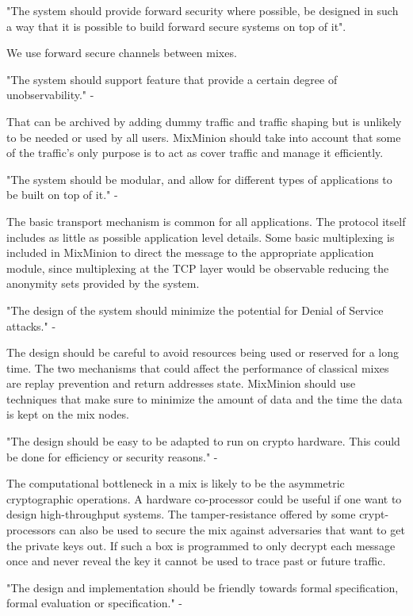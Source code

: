      "The system should provide forward security where possible, be
     designed in such a way that it is possible to build forward
     secure systems on top of it".

We use forward secure channels between mixes. 

     "The system should support feature that provide a certain degree
      of unobservability." -

That can be archived by adding dummy traffic and traffic shaping but
is unlikely to be needed or used by all users. MixMinion should take
into account that some of the traffic's only purpose is to act as
cover traffic and manage it efficiently.

     "The system should be modular, and allow for different types of
     applications to be built on top of it." -

The basic transport mechanism is common for all applications. The
protocol itself includes as little as possible application level
details. Some basic multiplexing is included in MixMinion to direct
the message to the appropriate application module, since multiplexing
at the TCP layer would be observable reducing the anonymity sets
provided by the system.

     "The design of the system should minimize the potential for
     Denial of Service attacks." -

The design should be careful to avoid resources being used or reserved
for a long time. The two mechanisms that could affect the performance
of classical mixes are replay prevention and return addresses
state. MixMinion should use techniques that make sure to minimize the
amount of data and the time the data is kept on the mix nodes. 

     "The design should be easy to be adapted to run on crypto
     hardware. This could be done for efficiency or security reasons."
     -

The computational bottleneck in a mix is likely to be the asymmetric
cryptographic operations. A hardware co-processor could be useful if
one want to design high-throughput systems. The tamper-resistance
offered by some crypt-processors can also be used to secure the mix
against adversaries that want to get the private keys out. If such a
box is programmed to only decrypt each message once and never reveal
the key it cannot be used to trace past or future traffic.

     "The design and implementation should be friendly towards formal
     specification, formal evaluation or specification." -

